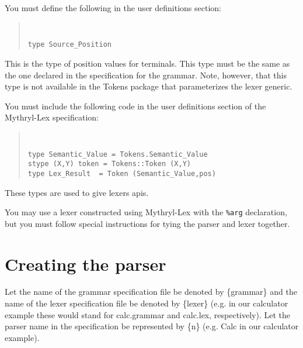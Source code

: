 You must define the following in the user definitions section:
\begin{quote}
\tt
\begin{verbatim}
type Source_Position
\end{verbatim}
\end{quote}
This is the type of position values for terminals.  This type
must be the same as the one declared in the specification for
the grammar.  Note, however, that this type is not available
in the Tokens package that parameterizes the lexer generic.

You must include the following code in the user definitions section of
the Mythryl-Lex specification:
\begin{quote}
\tt
\begin{verbatim}
type Semantic_Value = Tokens.Semantic_Value
stype (X,Y) token = Tokens::Token (X,Y)
type Lex_Result  = Token (Semantic_Value,pos)
\end{verbatim}
\end{quote}

These types are used to give lexers apis.

You may use a lexer constructed using Mythryl-Lex with the {\tt \%arg}
declaration, but you must follow special instructions for tying the parser
and lexer together.
 
\section{Creating the parser}
\label{create-parser}
Let the name of the grammar specification file be denoted by
\{grammar\} and the name of the lexer specification file be
denoted by \{lexer\} (e.g. in our calculator example these would
stand for calc.grammar and calc.lex, respectively).
Let the parser name in the specification be represented by \{n\}
(e.g. Calc in our calculator example).

